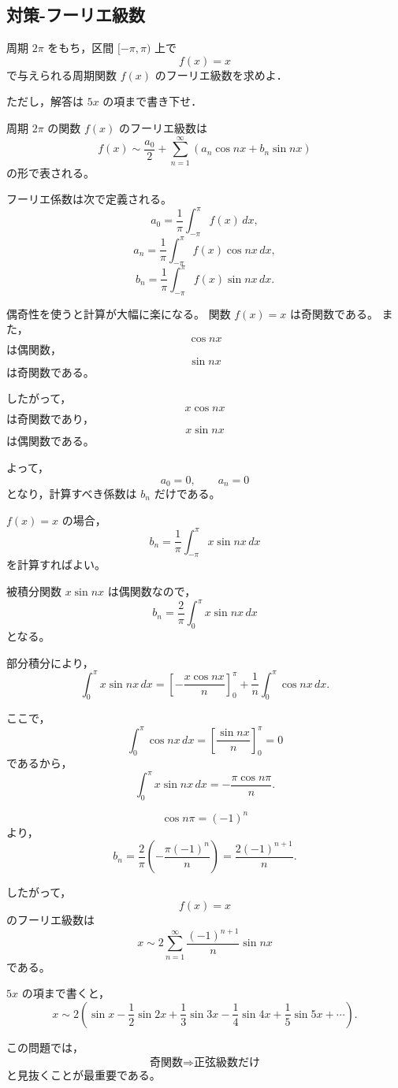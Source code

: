 \subsection{対策-フーリエ級数}
\begin{exercise}[フーリエ級数]
	周期 \(2\pi\) をもち，区間 \([-\pi,\pi)\) 上で
	\[
	f(x)=x
	\]
	で与えられる周期関数 \(f(x)\) のフーリエ級数を求めよ．
	
	ただし，解答は \(5x\) の項まで書き下せ．
\end{exercise}

\begin{background}
	周期 \(2\pi\) の関数 \(f(x)\) のフーリエ級数は
	\[
	f(x)\sim \frac{a_0}{2}
	+\sum_{n=1}^{\infty}
	\left(a_n\cos nx+b_n\sin nx\right)
	\]
	の形で表される。
	
	フーリエ係数は次で定義される。
	\[
	a_0=\frac{1}{\pi}\int_{-\pi}^{\pi}f(x)\,dx,
	\]
	\[
	a_n=\frac{1}{\pi}\int_{-\pi}^{\pi}f(x)\cos nx\,dx,
	\]
	\[
	b_n=\frac{1}{\pi}\int_{-\pi}^{\pi}f(x)\sin nx\,dx.
	\]
	
	偶奇性を使うと計算が大幅に楽になる。
	関数 \(f(x)=x\) は奇関数である。
	また，
	\[
	\cos nx
	\]
	は偶関数，
	\[
	\sin nx
	\]
	は奇関数である。
	
	したがって，
	\[
	x\cos nx
	\]
	は奇関数であり，
	\[
	x\sin nx
	\]
	は偶関数である。
	
	よって，
	\[
	a_0=0,\qquad a_n=0
	\]
	となり，計算すべき係数は \(b_n\) だけである。
\end{background}
\begin{strategy}
	\(f(x)=x\) の場合，
	\[
	b_n=\frac{1}{\pi}\int_{-\pi}^{\pi}x\sin nx\,dx
	\]
	を計算すればよい。
	
	被積分関数 \(x\sin nx\) は偶関数なので，
	\[
	b_n=\frac{2}{\pi}\int_{0}^{\pi}x\sin nx\,dx
	\]
	となる。
	
	部分積分により，
	\[
	\int_{0}^{\pi}x\sin nx\,dx
	=
	\left[-\frac{x\cos nx}{n}\right]_{0}^{\pi}
	+\frac{1}{n}\int_{0}^{\pi}\cos nx\,dx.
	\]
	
	ここで，
	\[
	\int_{0}^{\pi}\cos nx\,dx
	=
	\left[\frac{\sin nx}{n}\right]_{0}^{\pi}=0
	\]
	であるから，
	\[
	\int_{0}^{\pi}x\sin nx\,dx
	=
	-\frac{\pi\cos n\pi}{n}.
	\]
	
	\[
	\cos n\pi=(-1)^n
	\]
	より，
	\[
	b_n
	=
	\frac{2}{\pi}
	\left(
	-\frac{\pi(-1)^n}{n}
	\right)
	=
	\frac{2(-1)^{n+1}}{n}.
	\]
	
	したがって，
	\[
	f(x)=x
	\]
	のフーリエ級数は
	\[
	x\sim
	2\sum_{n=1}^{\infty}
	\frac{(-1)^{n+1}}{n}\sin nx
	\]
	である。
	
	\(5x\) の項まで書くと，
	\[
	x\sim
	2\left(
	\sin x
	-\frac{1}{2}\sin 2x
	+\frac{1}{3}\sin 3x
	-\frac{1}{4}\sin 4x
	+\frac{1}{5}\sin 5x
	+\cdots
	\right).
	\]
	
	この問題では，
	\[
	\text{奇関数} \Rightarrow \text{正弦級数だけ}
	\]
	と見抜くことが最重要である。
\end{strategy}